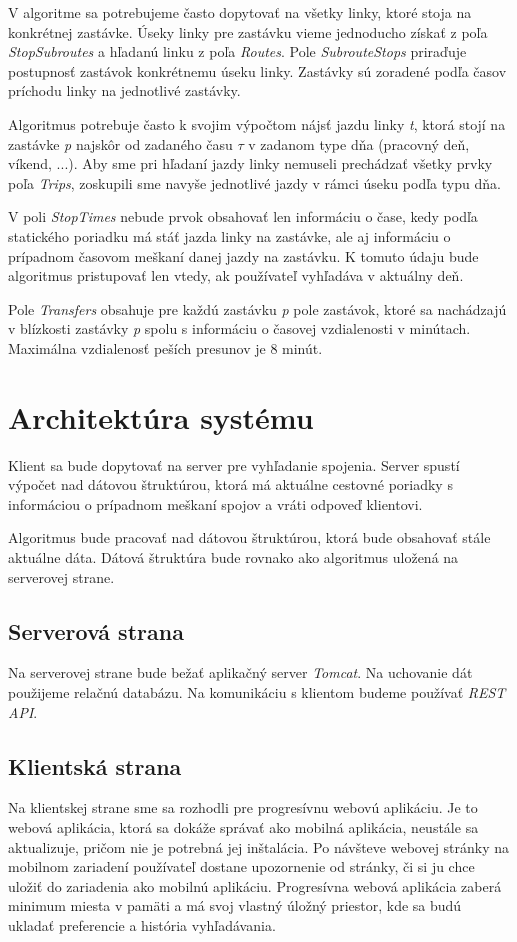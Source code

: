 V algoritme sa potrebujeme často dopytovať na všetky linky, ktoré stoja na konkrétnej zastávke. Úseky linky pre zastávku vieme jednoducho získať z poľa \textit{StopSubroutes} a hľadanú linku z poľa \textit{Routes}. Pole \textit{SubrouteStops} priraďuje postupnosť zastávok konkrétnemu úseku linky. Zastávky sú zoradené podľa časov príchodu linky na jednotlivé zastávky.

Algoritmus potrebuje často k svojim výpočtom nájsť jazdu linky \textit{t}, ktorá stojí na zastávke \textit{p} najskôr od zadaného času $\tau$ v zadanom type dňa (pracovný deň, víkend, ...). 
Aby sme pri hľadaní jazdy linky nemuseli prechádzať všetky prvky poľa \textit{Trips}, zoskupili sme navyše jednotlivé jazdy v rámci úseku podľa typu dňa.

V poli \textit{StopTimes} nebude prvok obsahovať len informáciu o čase, kedy podľa statického poriadku má stáť jazda linky na zastávke, ale aj informáciu o prípadnom časovom meškaní danej jazdy na zastávku. K tomuto údaju bude algoritmus pristupovať len vtedy, ak používateľ vyhľadáva v aktuálny deň. 

Pole \textit{Transfers} obsahuje pre každú zastávku \textit{p} pole zastávok, ktoré sa nachádzajú v blízkosti zastávky \textit{p} spolu s informáciu o časovej vzdialenosti v minútach. Maximálna vzdialenosť peších presunov je 8 minút. 


\section{Architektúra systému}

Klient sa bude dopytovať na server pre vyhľadanie spojenia. Server spustí výpočet nad dátovou štruktúrou, ktorá má aktuálne cestovné poriadky s informáciou o prípadnom meškaní spojov a vráti odpoveď klientovi.

Algoritmus bude pracovať nad dátovou štruktúrou, ktorá bude obsahovať stále aktuálne dáta. Dátová štruktúra bude rovnako ako algoritmus uložená na serverovej strane. 

\subsection{Serverová strana}
Na serverovej strane bude bežať aplikačný server \textit{Tomcat}. Na uchovanie dát použijeme relačnú databázu. Na komunikáciu s klientom budeme používať \textit{REST API}.

\subsection{Klientská strana}
Na klientskej strane sme sa rozhodli pre progresívnu webovú aplikáciu. Je to webová aplikácia, ktorá sa dokáže správať ako mobilná aplikácia, neustále sa aktualizuje, pričom nie je potrebná jej inštalácia. Po návšteve webovej stránky na mobilnom zariadení používateľ dostane upozornenie od stránky, či si ju chce uložiť do zariadenia ako mobilnú aplikáciu. Progresívna webová aplikácia zaberá minimum miesta v pamäti a má svoj vlastný úložný priestor, kde sa budú ukladať preferencie a história vyhľadávania.

